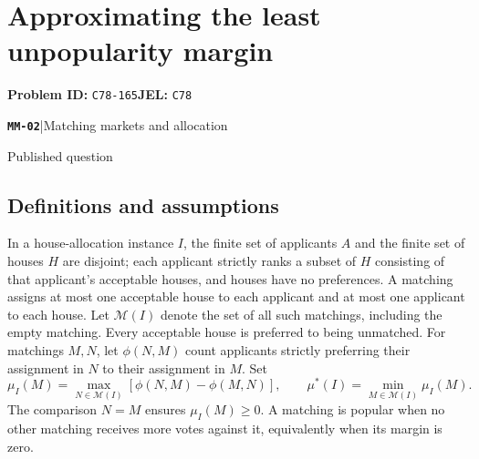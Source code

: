 \documentclass[11pt,a4paper]{article}
\newcommand{\entrymeta}[3]{{\sffamily\small\color{muted}\textbf{\texttt{#1}}\quad|\quad #2\par #3\par}}
\begin{document}
\section*{Approximating the least unpopularity margin}
\textbf{Problem ID:} \texttt{C78-165}\quad \textbf{JEL:} \texttt{C78}\par
\label{problem:OP-0543}
\label{beyond:MM-02}
\entrymeta{MM-02}{Matching markets and allocation}{Published question}
\subsection*{Definitions and assumptions}
In a house-allocation instance $I$, the finite set of applicants $A$ and the finite set of houses $H$ are disjoint; each applicant strictly ranks a subset of $H$ consisting of that applicant's acceptable houses, and houses have no preferences. A matching assigns at most one acceptable house to each applicant and at most one applicant to each house. Let $\mathcal M(I)$ denote the set of all such matchings, including the empty matching. Every acceptable house is preferred to being unmatched. For matchings $M,N$, let $\phi(N,M)$ count applicants strictly preferring their assignment in $N$ to their assignment in $M$. Set
\[
 \mu_I(M)=\max_{N\in\mathcal M(I)}[\phi(N,M)-\phi(M,N)],
 \qquad \mu^*(I)=\min_{M\in\mathcal M(I)}\mu_I(M).
\]
The comparison $N=M$ ensures $\mu_I(M)\ge0$. A matching is popular when no other matching receives more votes against it, equivalently when its margin is zero.
\end{document}
